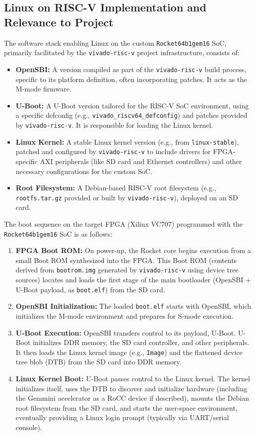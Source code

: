 \subsection{Linux on RISC-V Implementation and Relevance to Project}
\label{sec:linux_riscv_implementation}
The software stack enabling Linux on the custom \texttt{Rocket64b1gem16} SoC, primarily facilitated by the \texttt{vivado-risc-v} project infrastructure, consists of:
\begin{itemize}
    \item \textbf{OpenSBI:} A version compiled as part of the \texttt{vivado-risc-v} build process, specific to its platform definition, often incorporating patches. It acts as the M-mode firmware.
    \item \textbf{U-Boot:} A U-Boot version tailored for the RISC-V SoC environment, using a specific defconfig (e.g., \texttt{vivado\_riscv64\_defconfig}) and patches provided by \texttt{vivado-risc-v}. It is responsible for loading the Linux kernel.
    \item \textbf{Linux Kernel:} A stable Linux kernel version (e.g., from \texttt{linux-stable}), patched and configured by \texttt{vivado-risc-v} to include drivers for FPGA-specific AXI peripherals (like SD card and Ethernet controllers) and other necessary configurations for the custom SoC.
    \item \textbf{Root Filesystem:} A Debian-based RISC-V root filesystem (e.g., \texttt{rootfs.tar.gz} provided or built by \texttt{vivado-risc-v}), deployed on an SD card.
\end{itemize}

The boot sequence on the target FPGA (Xilinx VC707) programmed with the \texttt{Rocket64b1gem16} SoC is as follows:
\begin{enumerate}
    \item \textbf{FPGA Boot ROM:} On power-up, the Rocket core begins execution from a small Boot ROM synthesized into the FPGA. This Boot ROM (contents derived from \texttt{bootrom.img} generated by \texttt{vivado-risc-v} using device tree sources) locates and loads the first stage of the main bootloader (OpenSBI + U-Boot payload, as \texttt{boot.elf}) from the SD card.
    \item \textbf{OpenSBI Initialization:} The loaded \texttt{boot.elf} starts with OpenSBI, which initializes the M-mode environment and prepares for S-mode execution.
    \item \textbf{U-Boot Execution:} OpenSBI transfers control to its payload, U-Boot. U-Boot initializes DDR memory, the SD card controller, and other peripherals. It then loads the Linux kernel image (e.g., \texttt{Image}) and the flattened device tree blob (DTB) from the SD card into DDR memory.
    \item \textbf{Linux Kernel Boot:} U-Boot passes control to the Linux kernel. The kernel initializes itself, uses the DTB to discover and initialize hardware (including the Gemmini accelerator as a RoCC device if described), mounts the Debian root filesystem from the SD card, and starts the user-space environment, eventually providing a Linux login prompt (typically via UART/serial console).
\end{enumerate}

